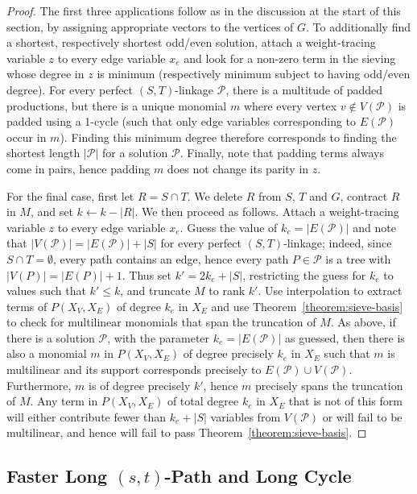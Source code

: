 \documentclass[10pt,a4paper]{article}
\newcommand{\cP}{\ensuremath{\mathcal P}\xspace}
\begin{document}
\begin{proof}
  The first three applications follow as in the discussion at the
  start of this section, by assigning appropriate vectors to the
  vertices of $G$. To additionally find a shortest, respectively
  shortest odd/even solution, attach a weight-tracing variable $z$ to
  every edge variable $x_e$ and look for a non-zero term in the
  sieving whose degree in $z$ is minimum (respectively minimum subject
  to having odd/even degree). For every perfect
  $(S,T)$-linkage $\cP$, there is a multitude of padded productions,
  but there is a unique monomial $m$ where every vertex $v
  \notin V(\cP)$ is padded using a 1-cycle (such that only edge
  variables corresponding to $E(\cP)$ occur in $m$).
  Finding this minimum degree therefore corresponds to finding the
  shortest length $|\cP|$ for a solution $\cP$. Finally, note that
  padding terms always come in pairs, hence padding $m$ does not
  change its parity in $z$.

  For the final case, first let $R=S \cap T$. We delete $R$ from $S$,
  $T$ and $G$, contract $R$ in $M$, and set $k \gets k-|R|$. We then proceed as follows.
  Attach a weight-tracing variable $z$ to every edge variable $x_e$.
  Guess the value of $k_e=|E(\cP)|$ and note that $|V(\cP)|=|E(\cP)|+|S|$ 
  for every perfect $(S,T)$-linkage; indeed, since $S \cap T = \emptyset$,
  every path contains an edge, hence every path $P \in \cP$
  is a tree with $|V(P)|=|E(P)|+1$. Thus set $k'=2k_e+|S|$,
  restricting the guess for $k_e$ to values such that $k' \leq k$,
  and truncate $M$ to rank $k'$. Use interpolation to extract terms of
  $P(X_V,X_E)$ of degree $k_e$ in $X_E$ and use Theorem~\ref{theorem:sieve-basis}
  to check for multilinear monomials that span the truncation of $M$. 
  As above, if there is a solution $\cP$, with the parameter
  $k_e=|E(\cP)|$ as guessed, then there is also a monomial $m$ in
  $P(X_V,X_E)$ of degree precisely $k_e$ in $X_E$ such that $m$
  is multilinear and its support corresponds precisely to $E(\cP) \cup
  V(\cP)$. Furthermore, $m$ is of degree precisely $k'$,
  hence $m$ precisely spans the truncation of $M$. 
  Any term in $P(X_V,X_E)$ of total degree $k_e$ in $X_E$ that is not of this form
  will either contribute fewer than $k_e+|S|$ variables from $V(\cP)$
  or will fail to be multilinear, and hence will fail to pass
  Theorem~\ref{theorem:sieve-basis}. 
\end{proof}

\subsection{Faster Long \texorpdfstring{$(s,t)$}{(s,t)}-Path and Long Cycle}
\end{document}
